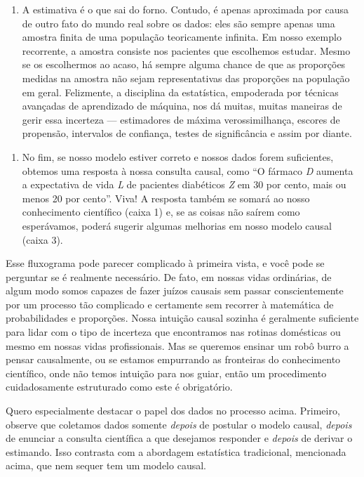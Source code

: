 \documentclass[11pt,a5paper,twoside]{book}
\begin{document}
\begin{enumerate}
\item A estimativa é o que sai do forno. Contudo, é apenas aproximada por causa de outro fato do mundo real sobre os dados: eles são sempre apenas uma amostra finita de uma população teoricamente infinita. Em nosso exemplo recorrente, a amostra consiste nos pacientes que escolhemos estudar. Mesmo se os escolhermos ao acaso, há sempre alguma chance de que as proporções medidas na amostra não sejam representativas das proporções na população em geral. Felizmente, a disciplina da estatística, empoderada por técnicas avançadas de aprendizado de máquina, nos dá muitas, muitas maneiras de gerir essa incerteza — estimadores de máxima verossimilhança, escores de propensão, intervalos de confiança, testes de significância e assim por diante.
\end{enumerate}
\begin{enumerate}
\item No fim, se nosso modelo estiver correto e nossos dados forem suficientes, obtemos uma resposta à nossa consulta causal, como “O fármaco \textit{D} aumenta a expectativa de vida \textit{L} de pacientes diabéticos \textit{Z} em 30 por cento, mais ou menos 20 por cento”. Viva! A resposta também se somará ao nosso conhecimento científico (caixa 1) e, se as coisas não saírem como esperávamos, poderá sugerir algumas melhorias em nosso modelo causal (caixa 3).
\end{enumerate}
Esse fluxograma pode parecer complicado à primeira vista, e você pode se perguntar se é realmente necessário. De fato, em nossas vidas ordinárias, de algum modo somos capazes de fazer juízos causais sem passar conscientemente por um processo tão complicado e certamente sem recorrer à matemática de probabilidades e proporções. Nossa intuição causal sozinha é geralmente suficiente para lidar com o tipo de incerteza que encontramos nas rotinas domésticas ou mesmo em nossas vidas profissionais. Mas se queremos ensinar um robô burro a pensar causalmente, ou se estamos empurrando as fronteiras do conhecimento científico, onde não temos intuição para nos guiar, então um procedimento cuidadosamente estruturado como este é obrigatório.

Quero especialmente destacar o papel dos dados no processo acima. Primeiro, observe que coletamos dados somente \textit{depois} de postular o modelo causal, \textit{depois} de enunciar a consulta científica a que desejamos responder e \textit{depois} de derivar o estimando. Isso contrasta com a abordagem estatística tradicional, mencionada acima, que nem sequer tem um modelo causal.
\end{document}
